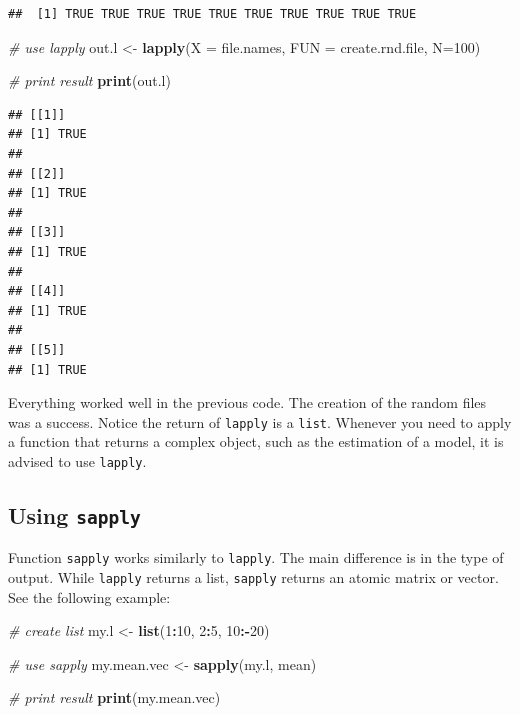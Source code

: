 \documentclass[11pt,]{book}
\newenvironment{Shaded}{\begin{snugshade}}{\end{snugshade}}
\newcommand{\KeywordTok}[1]{\textcolor[rgb]{0.27,0.27,0.27}{\textbf{#1}}}
\newcommand{\DataTypeTok}[1]{\textcolor[rgb]{0.27,0.27,0.27}{#1}}
\newcommand{\DecValTok}[1]{\textcolor[rgb]{0.06,0.06,0.06}{#1}}
\newcommand{\StringTok}[1]{\textcolor[rgb]{0.5,0.5,0.5}{#1}}
\newcommand{\CommentTok}[1]{\textcolor[rgb]{0.56,0.35,0.01}{\textit{#1}}}
\newcommand{\OperatorTok}[1]{\textcolor[rgb]{0.81,0.36,0.00}{\textbf{#1}}}
\newcommand{\NormalTok}[1]{#1}
\begin{document}
\begin{verbatim}
##  [1] TRUE TRUE TRUE TRUE TRUE TRUE TRUE TRUE TRUE TRUE
\end{verbatim}

\begin{Shaded}
\begin{Highlighting}[]
\CommentTok{# use lapply}
\NormalTok{out.l <-}\StringTok{ }\KeywordTok{lapply}\NormalTok{(}\DataTypeTok{X =}\NormalTok{ file.names, }\DataTypeTok{FUN =}\NormalTok{ create.rnd.file, }\DataTypeTok{N=}\DecValTok{100}\NormalTok{)}

\CommentTok{# print result}
\KeywordTok{print}\NormalTok{(out.l)}
\end{Highlighting}
\end{Shaded}

\begin{verbatim}
## [[1]]
## [1] TRUE
## 
## [[2]]
## [1] TRUE
## 
## [[3]]
## [1] TRUE
## 
## [[4]]
## [1] TRUE
## 
## [[5]]
## [1] TRUE
\end{verbatim}

Everything worked well in the previous code. The creation of the random
files was a success. Notice the return of \texttt{lapply} is a
\texttt{list}. Whenever you need to apply a function that returns a
complex object, such as the estimation of a model, it is advised to use
\texttt{lapply}.

\subsection{\texorpdfstring{Using
\texttt{sapply}}{Using sapply}}\label{using-sapply}

Function \texttt{sapply} works similarly to \texttt{lapply}. The main
difference is in the type of output. While \texttt{lapply} returns a
list, \texttt{sapply} returns an atomic matrix or vector. See the
following example: 

\begin{Shaded}
\begin{Highlighting}[]
\CommentTok{# create list}
\NormalTok{my.l <-}\StringTok{ }\KeywordTok{list}\NormalTok{(}\DecValTok{1}\OperatorTok{:}\DecValTok{10}\NormalTok{, }\DecValTok{2}\OperatorTok{:}\DecValTok{5}\NormalTok{, }\DecValTok{10}\OperatorTok{:-}\DecValTok{20}\NormalTok{)}

\CommentTok{# use sapply}
\NormalTok{my.mean.vec <-}\StringTok{ }\KeywordTok{sapply}\NormalTok{(my.l, mean)}

\CommentTok{# print result}
\KeywordTok{print}\NormalTok{(my.mean.vec)}
\end{Highlighting}
\end{Shaded}
\end{document}

